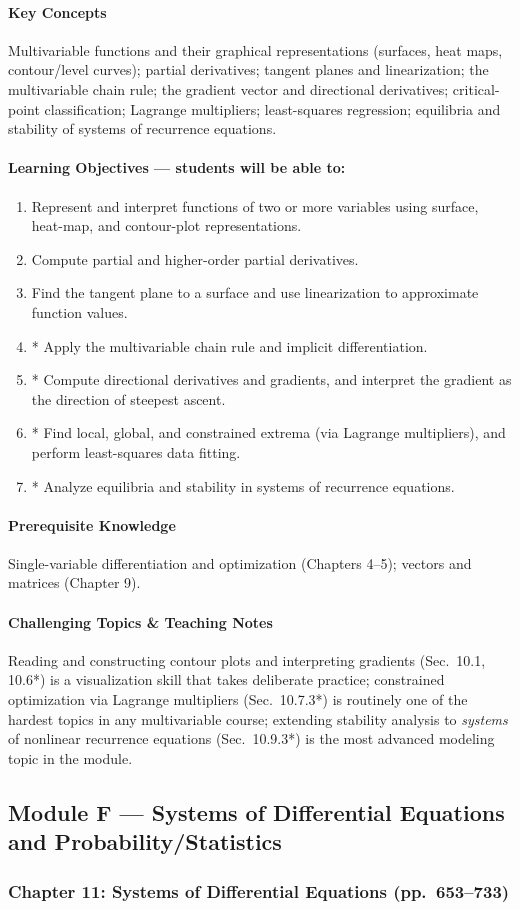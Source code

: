 \documentclass[11pt]{article}
\newcommand{\ChapHead}[2]{\subsubsection{#1 \textnormal{\normalfont\normalsize\color{lightgray}(pp.\ #2)}}}
\newcommand{\KeyConcepts}{\paragraph{Key Concepts}}
\newcommand{\LearnObj}{\paragraph{Learning Objectives --- students will be able to:}}
\newcommand{\PreReq}{\paragraph{Prerequisite Knowledge}}
\newcommand{\Hard}{\paragraph{Challenging Topics \& Teaching Notes}}
\begin{document}
\KeyConcepts
Multivariable functions and their graphical representations (surfaces,
heat maps, contour/level curves); partial derivatives; tangent planes and
linearization; the multivariable chain rule; the gradient vector and
directional derivatives; critical-point classification; Lagrange
multipliers; least-squares regression; equilibria and stability of systems
of recurrence equations.

\LearnObj
\begin{enumerate}
\item Represent and interpret functions of two or more variables using surface, heat-map, and contour-plot representations.
\item Compute partial and higher-order partial derivatives.
\item Find the tangent plane to a surface and use linearization to approximate function values.
\item * Apply the multivariable chain rule and implicit differentiation.
\item * Compute directional derivatives and gradients, and interpret the gradient as the direction of steepest ascent.
\item * Find local, global, and constrained extrema (via Lagrange multipliers), and perform least-squares data fitting.
\item * Analyze equilibria and stability in systems of recurrence equations.
\end{enumerate}

\PreReq Single-variable differentiation and optimization (Chapters 4--5); vectors and matrices (Chapter 9).

\Hard Reading and constructing contour plots and interpreting gradients
(Sec.\ 10.1, 10.6*) is a visualization skill that takes deliberate practice;
constrained optimization via Lagrange multipliers (Sec.\ 10.7.3*) is
routinely one of the hardest topics in any multivariable course; extending
stability analysis to \emph{systems} of nonlinear recurrence equations
(Sec.\ 10.9.3*) is the most advanced modeling topic in the module.

\subsection{Module F --- Systems of Differential Equations and Probability/Statistics}

\ChapHead{Chapter 11: Systems of Differential Equations}{653--733}
\end{document}
